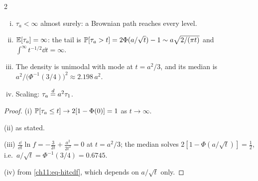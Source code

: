 \begin{paracol}{2}
\begin{proposition}\label{ch11:prop-tau}
\leavevmode
\begin{enumerate}[(i)]
  \item $\tau_a<\infty$ almost surely: a Brownian path reaches every level.
  \item $\mathbb{E}[\tau_a]=\infty$: the tail is $\mathbb{P}[\tau_a>t]=2\Phi(a/\sqrt t)-1\sim a\sqrt{2/(\pi t)}$ and $\int^\infty t^{-1/2}\dd t=\infty$.
  \item The density is unimodal with mode at $t=a^2/3$, and its median is $a^2/\bigl(\Phi^{-1}(3/4)\bigr)^2\approx2.198\,a^2$.
  \item Scaling: $\tau_a\stackrel{d}{=} a^2\tau_1$.
\end{enumerate}
\end{proposition}
\begin{proof}
(i) $\mathbb{P}[\tau_a\le t]\to2[1-\Phi(0)]=1$ as $t\to\infty$.

(ii) as stated.

(iii) $\frac{\dd}{\dd t}\ln f=-\tfrac{3}{2t}+\tfrac{a^2}{2t^2}=0$ at $t=a^2/3$;
the median solves $2[1-\Phi(a/\sqrt t)]=\tfrac12$, i.e.\ $a/\sqrt t=\Phi^{-1}(3/4)=0.6745$.

(iv) from \eqref{ch11:eq-hitcdf}, which depends on $a/\sqrt t$ only.
\end{proof}


\end{paracol}
